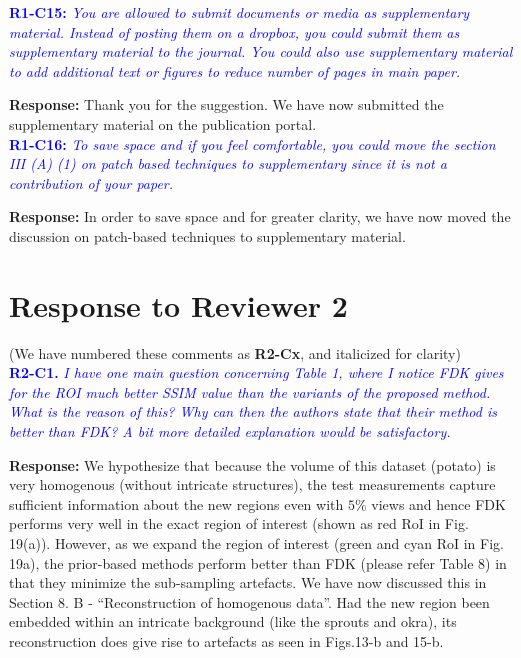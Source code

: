\documentclass{article}
\begin{document}
\textcolor{blue}{\textbf{R1-C15:}\textit{ You are allowed to submit documents or media as supplementary material. Instead of posting them on a dropbox, you could submit them as supplementary material to the journal. You could also use supplementary material to add additional text or figures to reduce number of pages in main paper.}}
    
\textbf{Response:} Thank you for the suggestion. We have now submitted the supplementary material  on the publication portal. \\

\textcolor{blue}{\textbf{R1-C16:}\textit{ To save space and if you feel comfortable, you could move the section III (A) (1) on patch based techniques to supplementary since it is not a contribution of your paper.}}
    
\textbf{Response:} In order to save space and for greater clarity, we have now moved the discussion on patch-based techniques to supplementary material.

\section{Response to Reviewer 2}
(We have numbered these comments as \textbf{R2-Cx}, and italicized for clarity)\\

\textcolor{blue}{\textbf{R2-C1.}\textit{ I have one main question concerning Table 1, where I notice FDK gives for the ROI much better SSIM value than the variants of the proposed method. What is the reason of this? Why can then the authors state that their method is better than FDK? A bit more detailed explanation would be satisfactory.}}

\textbf{Response:} We hypothesize that because the volume of this dataset (potato) is very homogenous (without intricate  structures), the test measurements capture sufficient information about the new regions even with $5\%$ views and hence FDK performs very well in the exact region of interest (shown as red RoI in Fig. 19(a)). However, as we expand the region of interest (green and cyan RoI in Fig. 19a), the prior-based methods perform better than FDK (please refer Table 8) in that they minimize the sub-sampling artefacts.  We have now discussed this in Section 8. B - ``Reconstruction of homogenous data''.
Had the new region been embedded within an intricate background (like the sprouts and okra), its reconstruction does give rise to artefacts as seen in Figs.13-b and 15-b. 
\end{document}
